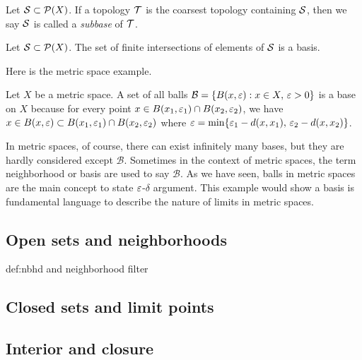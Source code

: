 \documentclass{../crs}
\begin{document}
\begin{defn}
Let $\mathcal{S}\subset\mathcal{P}(X)$.
If a topology $\mathcal{T}$ is the coarsest topology containing $\mathcal{S}$, then we say $\mathcal{S}$ is called a \emph{subbase} of $\mathcal{T}$.
\end{defn}
\begin{prop}
Let $\mathcal{S}\subset\mathcal{P}(X)$.
The set of finite intersections of elements of $\mathcal{S}$ is a basis.
\end{prop}

Here is the metric space example.
\begin{ex}
Let $X$ be a metric space.
A set of all balls $\mathcal{B}=\{B(x,\varepsilon):x\in X,\,\varepsilon>0\}$ is a base on $X$ because for every point $x\in B(x_1,\varepsilon_1)\cap B(x_2,\varepsilon_2)$, we have $x\in B(x,\varepsilon)\subset B(x_1,\varepsilon_1)\cap B(x_2,\varepsilon_2)$ where $\varepsilon=\min\{\varepsilon_1-d(x,x_1),\,\varepsilon_2-d(x,x_2)\}$.
\end{ex}

In metric spaces, of course, there can exist infinitely many bases, but they are hardly considered except $\mathcal{B}$.
Sometimes in the context of metric spaces, the term neighborhood or basis are used to say $\mathcal{B}$.
As we have seen, balls in metric spaces are the main concept to state $\varepsilon$-$\delta$ argument.
This example would show a basis is fundamental language to describe the nature of limits in metric spaces.










\subsection{Open sets and neighborhoods}
def:nbhd and neighborhood filter


\subsection{Closed sets and limit points}

\subsection{Interior and closure}
\end{document}
